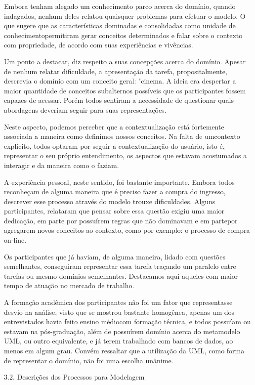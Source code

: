 Embora tenham alegado um conhecimento parco acerca do domínio, quando indagados, nenhum deles relatou quaisquer problemas para efetuar o modelo. O que sugere que as características dominadas e consolidadas como unidade de conhecimentopermitiram gerar conceitos determinados e falar sobre o contexto com propriedade, de acordo com suas experiências e vivências.

Um ponto a destacar, diz respeito a suas concepções acerca do domínio. Apesar de nenhum relatar dificuldade, a apresentação da tarefa, propositalmente, descrevia o domínio com um conceito geral: "cinema. A ideia era despertar a maior quantidade de conceitos subalternos possíveis que os participantes fossem capazes de acessar. Porém todos sentiram a necessidade de questionar quais abordagens deveriam seguir para suas representações.

Neste aspecto, podemos perceber que a contextualização está fortemente associada a maneira como definimos nossos conceitos. Na falta de umcontexto explícito, todos optaram por seguir a contextualização do usuário, isto é, representar o seu próprio entendimento, os aspectos que estavam acostumados a interagir e da maneira como o faziam.

A experiência pessoal, neste sentido, foi bastante importante. Embora todos reconheçam de alguma maneira que é preciso fazer a compra do ingresso, descrever esse processo através do modelo trouxe dificuldades. Alguns participantes, relataram que pensar sobre essa questão exigiu uma maior dedicação, em parte por possuírem regras que não dominavam e em partepor agregarem novos conceitos ao contexto, como por exemplo: o processo de compra on-line.

Os participantes que já haviam, de alguma maneira, lidado com questões semelhantes, conseguiram representar essa tarefa traçando um paralelo entre tarefas ou mesmo domínios semelhantes. Destacamos aqui aqueles com maior tempo de atuação no mercado de trabalho.

A formação acadêmica dos participantes não foi um fator que representasse desvio na análise, visto que se mostrou bastante homogênea, apenas um dos entrevistados havia feito ensino médiocom formação técnica, e todos possuíam ou estavam na pós-graduação, além de possuírem domínio acerca do metamodelo UML, ou outro equivalente, e já terem trabalhado com bancos de dados, ao menos em algum grau. Convém ressaltar que a utilização da UML, como forma de representar o domínio, não foi uma escolha unânime.

3.2. Descrições dos Processos para Modelagem

